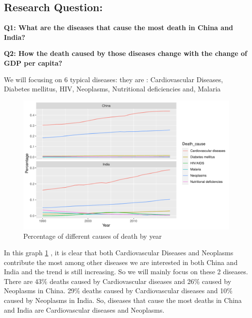 \documentclass[11pt,a4paper,]{article}
\begin{document}
\hypertarget{research-question}{%
\subsection{Research Question:}\label{research-question}}

\textbf{Q1: What are the diseases that cause the most death in China and India?}

\textbf{Q2: How the death caused by those diseases change with the change of GDP per capita?}

We will focusing on 6 typical diseases: they are : Cardiovascular Diseases, Diabetes mellitus, HIV, Neoplasms, Nutritional deficiencies and, Malaria

\begin{figure}
\centering
\includegraphics{Assignment4_files/figure-latex/percendeath-1.pdf}
\caption{\label{fig:percendeath}Percentage of different causes of death by year}
\end{figure}

In this graph \ref{fig:percendeath} , it is clear that both Cardiovascular Diseases and Neoplasms contribute the most among other diseases we are interested in both China and India and the trend is still increasing. So we will mainly focus on these 2 diseases. There are 43\% deaths caused by Cardiovascular diseases and 26\% caused by Neoplasms in China. 29\% deaths caused by Cardiovascular diseases and 10\% caused by Neoplasms in India. So, diseases that cause the most deaths in China and India are Cardiovascular diseases and Neoplasms.
\end{document}
